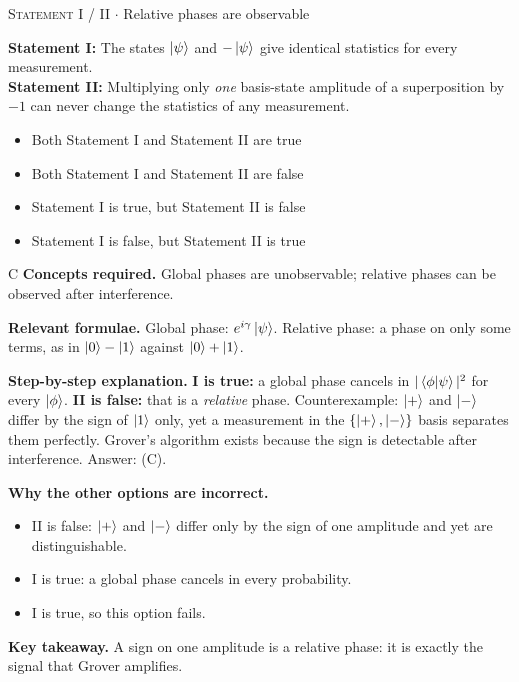 \documentclass[11pt,a4paper]{article}
\newcommand{\optlabel}[1]{\textbf{(#1)}}
\newcommand{\correctlabel}[1]{\textcolor{okgreen}{\textbf{(#1)}\,\ding{51}}}
\newenvironment{qitem}[1]{\begin{list}{}{\setlength{\leftmargin}{3.3em}\setlength{\labelwidth}{3.1em}%
  \setlength{\labelsep}{0.2em}\setlength{\topsep}{3pt}\setlength{\parsep}{3pt}}\item[\textbf{Q.#1}\hfill]}{\end{list}}
\newcommand{\qsep}{\par\vspace{2pt}{\color{black!15}\hrule}\vspace{4pt}}
\newcommand{\qmeta}[2]{{\footnotesize\color{black!60}\textsc{#1} \;$\cdot$\; #2}\par}
\begin{document}
\begin{qitem}{38}
\qmeta{Statement I / II}{Relative phases are observable}
\textbf{Statement I:} The states $\ket\psi$ and $-\ket\psi$ give identical statistics for every measurement.\\[1mm]
\textbf{Statement II:} Multiplying only \emph{one} basis-state amplitude of a superposition by $-1$ can never change the statistics of any measurement.
\begin{itemize}[leftmargin=2.6em, labelsep=0.4em, itemsep=2pt, topsep=3pt]
\item[\optlabel{A}] Both Statement I and Statement II are true
\item[\optlabel{B}] Both Statement I and Statement II are false
\item[\correctlabel{C}] Statement I is true, but Statement II is false
\item[\optlabel{D}] Statement I is false, but Statement II is true
\end{itemize}
\end{qitem}
\begin{solbox}{C}
\textbf{\color{brand}Concepts required.} Global phases are unobservable; relative phases can be observed after interference.

\textbf{\color{brand}Relevant formulae.} Global phase: $e^{i\gamma}\ket\psi$. Relative phase: a phase on only some terms, as in $\ket0 - \ket1$ against $\ket0 + \ket1$.

\textbf{\color{brand}Step-by-step explanation.} \textbf{I is true:} a global phase cancels in $|\braket{\phi|\psi}|^2$ for every $\ket\phi$.
\textbf{II is false:} that is a \emph{relative} phase. Counterexample: $\ket{+}$ and $\ket{-}$ differ by the sign of $\ket1$ only, yet a measurement in the $\{\ket{+}, \ket{-}\}$ basis separates them perfectly.
Grover's algorithm exists because the sign is detectable after interference. Answer: (C).

\textbf{\color{brand}Why the other options are incorrect.}
\begin{itemize}[leftmargin=2.4em, itemsep=1pt, topsep=2pt]
\item[\textbf{(A)}] II is false: $\ket{+}$ and $\ket{-}$ differ only by the sign of one amplitude and yet are distinguishable.
\item[\textbf{(B)}] I is true: a global phase cancels in every probability.
\item[\textbf{(D)}] I is true, so this option fails.
\end{itemize}
\textbf{\color{brand}Key takeaway.} A sign on one amplitude is a relative phase: it is exactly the signal that Grover amplifies.
\end{solbox}
\qsep
\end{document}
